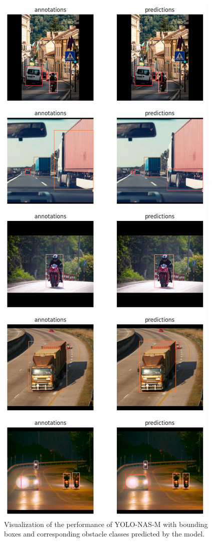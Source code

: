 \begin{figure}[H]
    \centering
    \includegraphics[width=0.6\linewidth]{tex/img/YNM2_AP_4.png}
    \caption{Visualization of the performance of YOLO-NAS-M with bounding boxes and corresponding obstacle
classes predicted by the model.}
    \label{fig:M-annot-pred}
\end{figure}

